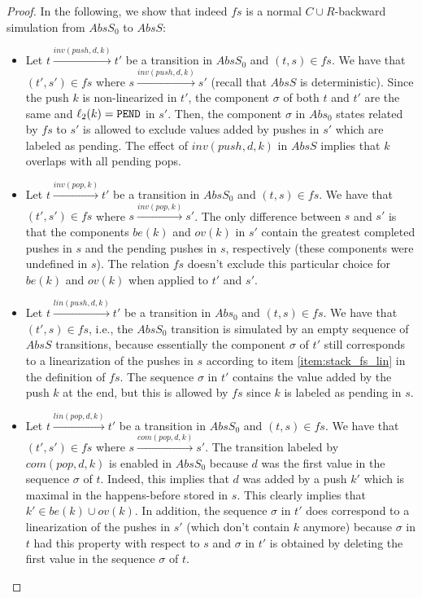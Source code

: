 \begin{proof}
In the following, we show that indeed $fs$ is a normal $C\cup R$-backward simulation from $AbsS_0$ to $AbsS$:
\begin{itemize}
	\item Let $t\xrightarrow{inv(push,d,k)} t'$ be a transition in $AbsS_0$ and $(t,s)\in fs$. We have that $(t',s')\in fs$ where $s\xrightarrow{inv(push,d,k)} s'$ (recall that $AbsS$ is deterministic). Since the push $k$ is non-linearized in $t'$, the component $\sigma$ of both $t$ and $t'$ are the same and $\ell_2(k)={\tt PEND}$ in $s'$. Then, the component $\sigma$ in $Abs_0$ states related by $fs$ to $s'$ is allowed to exclude values added by pushes in $s'$ which are labeled as pending. The effect of $inv(push,d,k)$ in $AbsS$ implies that $k$ overlaps with all pending pops.
	\item Let $t\xrightarrow{inv(pop,k)} t'$ be a transition in $AbsS_0$ and $(t,s)\in fs$. We have that $(t',s')\in fs$ where $s\xrightarrow{inv(pop,k)} s'$. The only difference between $s$ and $s'$ is that the components $be(k)$ and $ov(k)$ in $s'$ contain the greatest completed pushes in $s$ and the pending pushes in $s$, respectively (these components were undefined in $s$). The relation $fs$ doesn't exclude this particular choice for $be(k)$ and $ov(k)$ when applied to $t'$ and $s'$.
	\item Let $t\xrightarrow{lin(push,d,k)} t'$ be a transition in $Abs_0$ and $(t,s)\in fs$. We have that $(t',s)\in fs$, i.e., the $AbsS_0$ transition is simulated by an empty sequence of $AbsS$ transitions, because essentially the component $\sigma$ of $t'$ still corresponds to a linearization of the pushes in $s$ according to item \ref{item:stack_fs_lin} in the definition of $fs$. The sequence $\sigma$ in $t'$ contains the value added by the push $k$ at the end, but this is allowed by $fs$ since $k$ is labeled as pending in $s$.
	\item Let $t\xrightarrow{lin(pop,d,k)} t'$ be a transition in $AbsS_0$ and $(t,s)\in fs$. We have that $(t',s')\in fs$ where $s\xrightarrow{com(pop,d,k)} s'$. The transition labeled by $com(pop,d,k)$ is enabled in $AbsS_0$ because $d$ was the first value in the sequence $\sigma$ of $t$. Indeed, this implies that $d$ was added by a push $k'$ which is maximal in the happens-before stored in $s$. This clearly implies that $k'\in be(k)\cup ov(k)$. In addition, the sequence $\sigma$ in $t'$ does correspond to a linearization of the pushes in $s'$ (which don't contain $k$ anymore) because $\sigma$ in $t$ had this property with respect to $s$ and $\sigma$ in $t'$ is obtained by deleting the first value in the sequence $\sigma$ of $t$. 

\end{itemize}
\end{proof}
